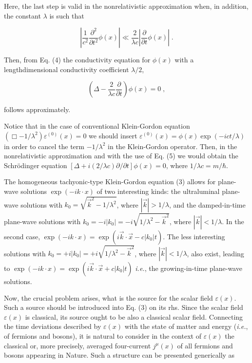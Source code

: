 \documentclass[a4paper,12pt]{article}
\begin{document}
\ni Here, the last step is valid in the nonrelativistic approximation when, in addition, the constant $\lambda$ is such that

\begin{equation}
|\frac{1}{c^2} \frac{\partial^2}{\partial t^2} \phi(x)| \ll \frac{2}{\lambda c}|\frac{\partial}{\partial t}\phi(x)|\;.
\end{equation}

\ni Then, from Eq. (4) the conductivity equation for $\phi(x)$ with a lengthdimensional conductivity coefficient $\lambda/2$,

\begin{equation}
\left(\Delta - \frac{2}{\lambda c} \frac{\partial}{\partial t} \right) \phi(x) = 0 \;,
\end{equation}

\ni follows approximately.

Notice that in the case of conventional Klein-Gordon equation $\left( \Box - 1/\lambda^2 \right) \varepsilon^{(0)} (x) = 0$ we should insert $\varepsilon^{(0)} (x) = \phi(x) \exp (-ict/\lambda)$ in order to cancel the term $-1/\lambda^2$ in the Klein-Gordon operator. Then, in the nonrelativistic approximation and with the use of Eq. (5) we would obtain the Schr\"{o}dinger equation $[\Delta + i(2/\lambda c) \partial/\partial t] \phi(x) = 0$, where $1/\lambda c = m/\hbar $.

The homogeneous tachyonic-type Klein-Gordon equation (3) allows for plane-wave solutions $\exp(-i k\cdot x)$ of two interesting kinds: the ultraluminal plane-wave solutions with $k_0 = \sqrt{\vec{k}^2 - 1/\lambda^2}$, where $|\vec{k}| > 1/\lambda$, and the damped-in-time plane-wave solutions with $k_0 = -i|k_0| = -i\sqrt{1/\lambda^2 - \vec{k}^2}$, where $|\vec{k}| < 1/\lambda$. In the second case, $\exp(-i k\cdot x) = \exp(i\vec{k}\cdot \vec{x} - c|k_0|t)$. The less interesting solutions with $k_0 = +i|k_0| = + i\sqrt{1/\lambda^2 - \vec{k}^2}$, where $|\vec{k}| < 1/\lambda$, also exist, leading to $\exp(-i k\cdot x) = \exp(i\vec{k}\cdot \vec{x} + c|k_0|t)$ {\it i.e.}, the growing-in-time plane-wave solutions.

Now, the crucial problem arises, what is the source for the scalar field $\varepsilon(x)$. Such a source should be introduced into Eq. (3) on its rhs. Since the scalar field $\varepsilon(x)$ is classical, its source ought to be also a classical scalar field. Connecting the time deviations described by $\varepsilon(x)$ with the state of matter and energy ({\it i.e.}, of fermions and bosons), it is natural to consider in the context of $\varepsilon(x)$ the classical or, more precisely, averaged four-current $ j^\mu (x)$ of all fermions and bosons appearing in Nature. Such a structure can be presented generically as
\end{document}
